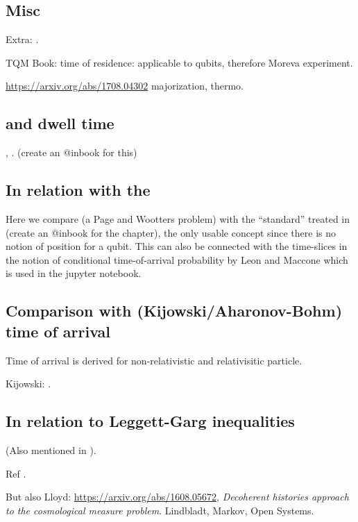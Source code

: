 \subsection{Misc}

Extra: \cite{TimeAnyons}.

TQM Book: time of residence: applicable to qubits, therefore Moreva experiment.

\url{https://arxiv.org/abs/1708.04302} majorization, thermo.


\subsection{and dwell time}

\cite[]{TQM2}, \cite{YearsleyHalliwell_Clocks}. (create an @inbook for this)

\subsection{In relation with the }

Here we compare \cite{Moreva:synthetic, Moreva:illustration}
(a Page and Wootters problem)
with the ``standard'' 
treated in \cite[.2]{TQM2} (create an @inbook for the chapter), 
the only usable concept since there is no notion of position
for a qubit. This can also be connected with the time-slices
in the notion of conditional time-of-arrival probability  by Leon and Maccone
which is used in the jupyter notebook.

\subsection[Comparison with Kijowski/Aharonov-Bohm]{Comparison with (Kijowski/Aharonov-Bohm) time of arrival}

Time of arrival is derived for non-relativistic \parencite{Delgado_TOA, Delgado_TOA2}
and relativisitic \parencite{Leon_TOA_R}
particle.

Kijowski: \cite{Kijowski_Time, Kijowski_Comment}.

\subsection{In relation to Leggett-Garg inequalities}
(Also mentioned in \cite{Moreva_position}).

Ref \cite{LeggettGarg+PageWootters}.

But also Lloyd: \url{https://arxiv.org/abs/1608.05672},
\emph{Decoherent histories approach to the cosmological measure problem}.
Lindbladt, Markov, Open Systems.


